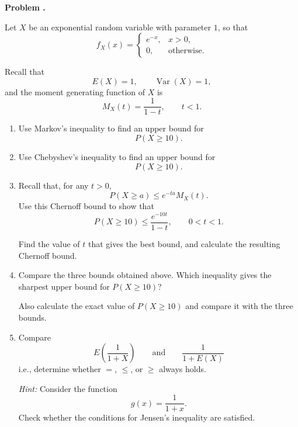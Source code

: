 \documentclass[11pt]{article}
\newcounter{problem}
\newenvironment{problem}[1][]{
    \refstepcounter{problem}
    \begin{problemheader}
        \textbf{Problem \theproblem%
        \if\relax\detokenize{#1}\relax
        \else. #1%
        \fi}
    \end{problemheader}
}{
    \vspace{0.5em}
}
\begin{document}

\newpage
\begin{problem}

Let \(X\) be an exponential random variable with parameter \(1\), so that
\[
f_X(x)
=
\begin{cases}
e^{-x}, & x>0,\\
0, & \text{otherwise}.
\end{cases}
\]

Recall that
\[
E(X)=1,
\qquad
\operatorname{Var}(X)=1,
\]
and the moment generating function of \(X\) is
\[
M_X(t)=\frac{1}{1-t},
\qquad t<1.
\]

\begin{enumerate}[label=(\alph*)]

    \item Use Markov's inequality to find an upper bound for
    \[
    P(X\geq 10).
    \]

    \item Use Chebyshev's inequality to find an upper bound for
    \[
    P(X\geq 10).
    \]

    \item Recall that, for any \(t>0\),
    \[
    P(X\geq a)
    \leq
    e^{-ta}M_X(t).
    \]
    Use this Chernoff bound to show that
    \[
    P(X\geq 10)
    \leq
    \frac{e^{-10t}}{1-t},
    \qquad 0<t<1.
    \]

    Find the value of \(t\) that gives the best bound, and calculate the
    resulting Chernoff bound.

    \item Compare the three bounds obtained above. Which inequality gives
    the sharpest upper bound for \(P(X\geq10)\)?

    Also calculate the exact value of \(P(X\geq10)\) and compare it with
    the three bounds.

    \item Compare
    \[
    E\left(\frac{1}{1+X}\right)
    \qquad\text{and}\qquad
    \frac{1}{1+E(X)}
    \]
    i.e., determine whether \(=\), \(\leq\), or \(\geq\) always holds.

    \textit{Hint:} Consider the function
    \[
    g(x)=\frac{1}{1+x}.
    \]
    Check whether the conditions for Jensen's inequality are satisfied.

\end{enumerate}

\end{problem}
\end{document}
